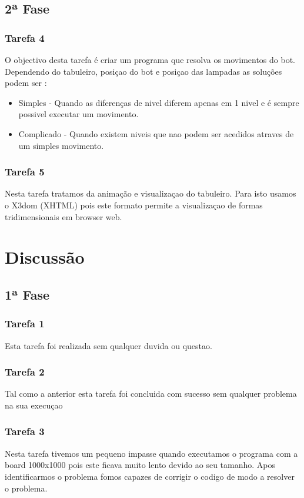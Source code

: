 \documentclass{report}
\begin{document}
\section{2ª Fase}
\subsection{Tarefa 4}
O objectivo desta tarefa é criar um programa que resolva os movimentos do bot. Dependendo do tabuleiro, posiçao do bot e posiçao das lampadas as soluções podem ser :

\begin{itemize}
\item Simples - Quando as diferenças de nivel diferem apenas em 1 nivel e é sempre possivel executar um movimento.
\item Complicado - Quando existem niveis que nao podem ser acedidos atraves de um simples movimento.
\end{itemize}

\subsection{Tarefa 5}
Nesta tarefa tratamos da animação e visualizaçao do tabuleiro. Para isto usamos o X3dom (XHTML) pois este formato permite a visualizaçao de formas tridimensionais em browser web.

\chapter{Discussão}

\section{1ª Fase}
\subsection{Tarefa 1}
Esta tarefa foi realizada sem qualquer duvida ou questao.
\subsection{Tarefa 2}
Tal como a anterior esta tarefa foi concluida com sucesso sem qualquer problema na sua execuçao
\subsection{Tarefa 3}
Nesta tarefa tivemos um pequeno impasse quando executamos o programa com a board 1000x1000 pois este ficava muito lento devido ao seu tamanho. Apos identificarmos o problema fomos capazes de corrigir o codigo de modo a resolver o problema. 
\end{document}
